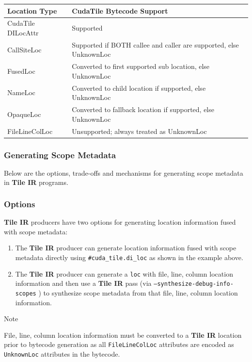 \documentclass{article}
\begin{document}
\begin{longtable}{l|l}
\hline
Location Type & CudaTile Bytecode Support \\ \hline
CudaTile DILocAttr & Supported \\ \hline
CallSiteLoc & Supported if BOTH callee and caller are supported, else UnknownLoc \\ \hline
FusedLoc & Converted to first supported sub location, else UnknownLoc \\ \hline
NameLoc & Converted to child location if supported, else UnknownLoc \\ \hline
OpaqueLoc & Converted to fallback location if supported, else UnknownLoc \\ \hline
FileLineColLoc & Unsupported; always treated as UnknownLoc \\ \hline
\end{longtable}


\subsubsection{Generating Scope Metadata}

Below are the options, trade-offs and mechanisms for generating scope metadata in \textbf{Tile IR} programs.



\subsubsection{Options}

\textbf{Tile IR} producers have two options for generating location information fused with scope metadata:


\begin{enumerate}
\item The \textbf{Tile IR} producer can generate location information fused with scope metadata directly using \texttt{\#cuda\_tile.di\_loc} as shown in the example above.
\item The \textbf{Tile IR} producer can generate a \texttt{loc} with file, line, column location information and then use a \textbf{Tile IR} pass (via \texttt{--synthesize-debug-info-scopes} ) to synthesize scope metadata from that file, line, column location information.

\end{enumerate}
Note


File, line, column location information must be converted to a \textbf{Tile IR} location prior to bytecode generation as all \texttt{FileLineColLoc} attributes are encoded as \texttt{UnknownLoc} attributes in the bytecode.
\end{document}
